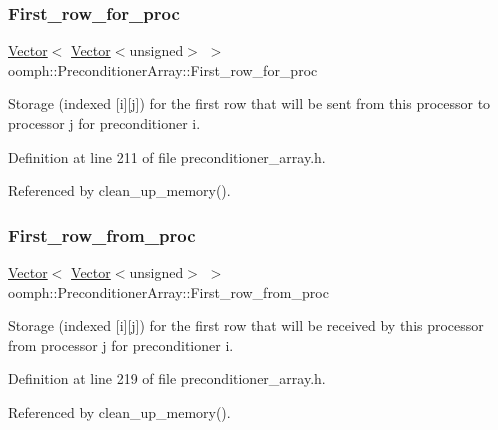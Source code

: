 \subsubsection{\texorpdfstring{First\+\_\+row\+\_\+for\+\_\+proc}{First\_row\_for\_proc}}
{\footnotesize\ttfamily \hyperlink{classoomph_1_1Vector}{Vector}$<$ \hyperlink{classoomph_1_1Vector}{Vector}$<$unsigned$>$ $>$ oomph\+::\+Preconditioner\+Array\+::\+First\+\_\+row\+\_\+for\+\_\+proc\hspace{0.3cm}{\ttfamily [private]}}



Storage (indexed \mbox{[}i\mbox{]}\mbox{[}j\mbox{]}) for the first row that will be sent from this processor to processor j for preconditioner i. 



Definition at line 211 of file preconditioner\+\_\+array.\+h.



Referenced by clean\+\_\+up\+\_\+memory().

\mbox{\label{classoomph_1_1PreconditionerArray_aff927480c2621ca698ac892ccc28b86c}} 
\subsubsection{\texorpdfstring{First\+\_\+row\+\_\+from\+\_\+proc}{First\_row\_from\_proc}}
{\footnotesize\ttfamily \hyperlink{classoomph_1_1Vector}{Vector}$<$ \hyperlink{classoomph_1_1Vector}{Vector}$<$unsigned$>$ $>$ oomph\+::\+Preconditioner\+Array\+::\+First\+\_\+row\+\_\+from\+\_\+proc\hspace{0.3cm}{\ttfamily [private]}}



Storage (indexed \mbox{[}i\mbox{]}\mbox{[}j\mbox{]}) for the first row that will be received by this processor from processor j for preconditioner i. 



Definition at line 219 of file preconditioner\+\_\+array.\+h.



Referenced by clean\+\_\+up\+\_\+memory().

